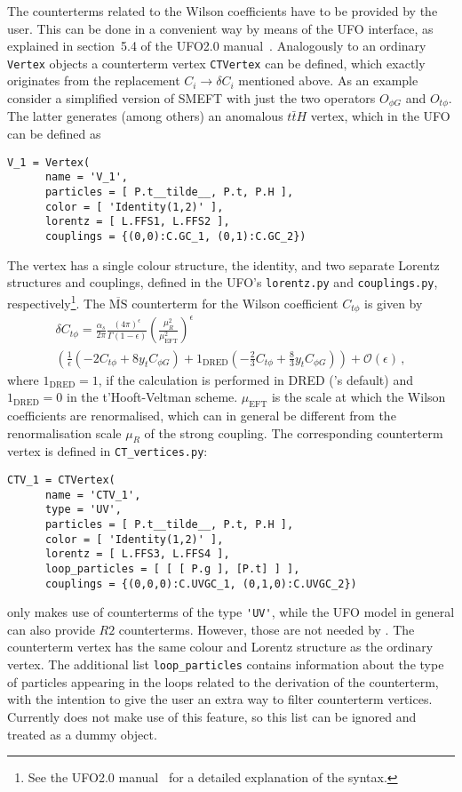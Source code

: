 The counterterms related to the Wilson coefficients have to be provided by the user. This can be done in a convenient way by means of the UFO interface, as explained in section~5.4 of the UFO2.0 manual~\cite{Darme:2023jdn}. Analogously to an ordinary \texttt{Vertex} objects a counterterm vertex \texttt{CTVertex} can be defined, which exactly originates from the replacement $C_i\to \delta C_i$ mentioned above. As an example consider a simplified version of SMEFT with just the two operators $O_{\phi G}$ and $O_{t\phi}$. The latter generates (among others) an anomalous $t\bar{t}H$ vertex, which in the UFO can be defined as
\begin{lstlisting}[gobble=3, style=py]
   V_1 = Vertex(
      name = 'V_1',
      particles = [ P.t__tilde__, P.t, P.H ],
      color = [ 'Identity(1,2)' ],
      lorentz = [ L.FFS1, L.FFS2 ],
      couplings = {(0,0):C.GC_1, (0,1):C.GC_2})
\end{lstlisting}
The vertex has a single colour structure, the identity, and two separate Lorentz structures and couplings, defined in the UFO's \texttt{lorentz.py} and \texttt{couplings.py}, respectively\footnote{See the UFO2.0 manual~\cite{Darme:2023jdn} for a detailed explanation of the syntax.}. The $\overline{\text{MS}}$ counterterm for the Wilson coefficient $C_{t\phi}$ is given by
\begin{multline}\label{eq:Ctphi_CT}
   \delta C_{t\phi} = \frac{\alpha_s}{2\pi}\frac{(4\pi)^\epsilon}{\Gamma(1-\epsilon)}\left(\frac{\mu_R^2}{\mu_\mathrm{EFT}^2}\right)^\epsilon\\\left(\frac{1}{\epsilon}\left(-2C_{t\phi}+8y_tC_{\phi G}\right)\right. + \left.1_\mathrm{DRED}\left(-\frac{2}{3}C_{t\phi}+\frac{8}{3}y_tC_{\phi G}\right)\right) + \mathcal{O}(\epsilon)\,,
\end{multline}
where $1_\mathrm{DRED}=1$, if the calculation is performed in DRED (\gosam's default) and $1_\mathrm{DRED}=0$ in the t'Hooft-Veltman scheme. $\mu_\mathrm{EFT}$ is the scale at which the Wilson coefficients are renormalised, which can in general be different from the renormalisation scale $\mu_R$ of the strong coupling. The corresponding counterterm vertex is defined in \texttt{CT\_vertices.py}:
\begin{lstlisting}[gobble=3, style=py]
   CTV_1 = CTVertex(
      name = 'CTV_1',
      type = 'UV',
      particles = [ P.t__tilde__, P.t, P.H ],
      color = [ 'Identity(1,2)' ],
      lorentz = [ L.FFS3, L.FFS4 ],
      loop_particles = [ [ [ P.g ], [P.t] ] ],
      couplings = {(0,0,0):C.UVGC_1, (0,1,0):C.UVGC_2})
\end{lstlisting}
\gosam only makes use of counterterms of the type \lstinline{'UV'}, while the UFO model in general can also provide $R2$ counterterms. However, those are not needed by \gosam. The counterterm vertex has the same colour and Lorentz structure as the ordinary vertex. The additional list \texttt{loop\_particles} contains information about the type of particles appearing in the loops related to the derivation of the counterterm, with the intention to give the user an extra way to filter counterterm vertices. Currently \gosam does not make use of this feature, so this list can be ignored and treated as a dummy object.

